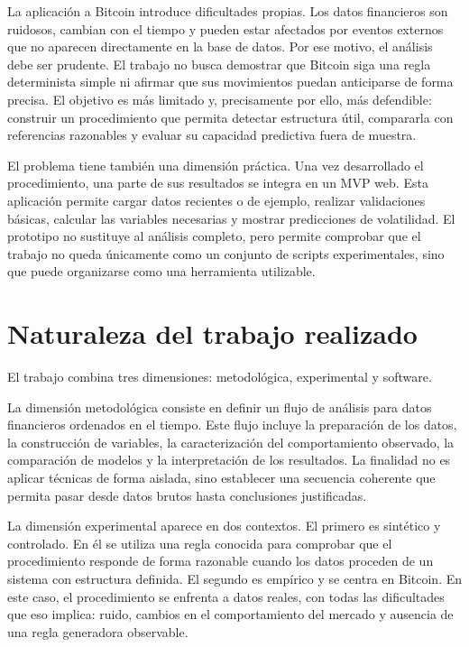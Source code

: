 La aplicación a Bitcoin introduce dificultades propias. Los datos financieros son ruidosos, cambian con el tiempo y pueden estar afectados por eventos externos que no aparecen directamente en la base de datos. Por ese motivo, el análisis debe ser prudente. El trabajo no busca demostrar que Bitcoin siga una regla determinista simple ni afirmar que sus movimientos puedan anticiparse de forma precisa. El objetivo es más limitado y, precisamente por ello, más defendible: construir un procedimiento que permita detectar estructura útil, compararla con referencias razonables y evaluar su capacidad predictiva fuera de muestra.

El problema tiene también una dimensión práctica. Una vez desarrollado el procedimiento, una parte de sus resultados se integra en un MVP web. Esta aplicación permite cargar datos recientes o de ejemplo, realizar validaciones básicas, calcular las variables necesarias y mostrar predicciones de volatilidad. El prototipo no sustituye al análisis completo, pero permite comprobar que el trabajo no queda únicamente como un conjunto de scripts experimentales, sino que puede organizarse como una herramienta utilizable.

\section{Naturaleza del trabajo realizado}\label{sec:naturaleza-trabajo}

El trabajo combina tres dimensiones: metodológica, experimental y software.

La dimensión metodológica consiste en definir un flujo de análisis para datos financieros ordenados en el tiempo. Este flujo incluye la preparación de los datos, la construcción de variables, la caracterización del comportamiento observado, la comparación de modelos y la interpretación de los resultados. La finalidad no es aplicar técnicas de forma aislada, sino establecer una secuencia coherente que permita pasar desde datos brutos hasta conclusiones justificadas.

La dimensión experimental aparece en dos contextos. El primero es sintético y controlado. En él se utiliza una regla conocida para comprobar que el procedimiento responde de forma razonable cuando los datos proceden de un sistema con estructura definida. El segundo es empírico y se centra en Bitcoin. En este caso, el procedimiento se enfrenta a datos reales, con todas las dificultades que eso implica: ruido, cambios en el comportamiento del mercado y ausencia de una regla generadora observable.

